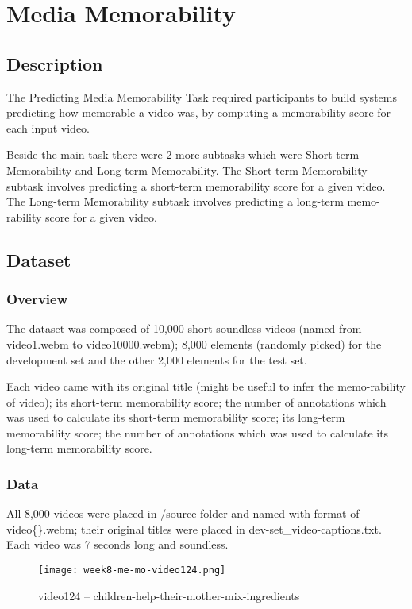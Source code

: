 {\section{Media Memorability}
\subsection{Description}
The Predicting Media Memorability Task\cite{memo18} required participants to build systems predicting how memorable a video was, by computing a memorability score for each input video.

Beside the main task there were 2 more subtasks which were Short-term Memorability and Long-term Memorability\cite{longtermmem}. The Short-term Memorability subtask involves predicting a short-term memorability score for a given video. The Long-term Memorability subtask involves predicting a long-term memo-rability score for a given video.

\subsection{Dataset}
\subsubsection{Overview}
The dataset was composed of 10,000 short soundless videos (named from video1.webm to video10000.webm); 8,000 elements (randomly picked) for the development set and the other 2,000 elements for the test set.

Each video came with its original title (might be useful to infer the memo-rability of video); its short-term memorability score; the number of annotations which was used to calculate its short-term memorability score; its long-term memorability score; the number of annotations which was used to calculate its long-term memorability score.

\subsubsection{Data}
All 8,000 videos were placed in /source folder and named with format of video\{\}.webm; their original titles were placed in dev-set\_video-captions.txt. Each video was 7 seconds long and soundless.

\begin{figure}[!ht]
\centering
\texttt{[image: week8-me-mo-video124.png]}
\caption{video124 -- children-help-their-mother-mix-ingredients}
\end{figure}

}
